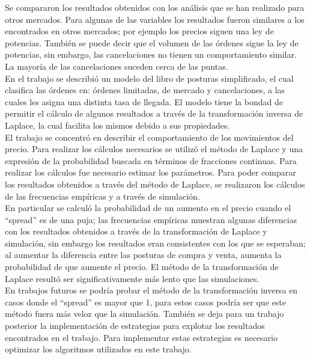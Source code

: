 \documentclass[11pt]{article}
\numberwithin{equation}{section} %
\begin{document}
Se compararon los resultados obtenidos con los análisis que se han realizado para otros mercados. Para algunas de las variables los resultados fueron similares a los encontrados en otros mercados; por ejemplo los precios siguen una ley de potencias. También se puede decir que el volumen de las órdenes sigue la ley de potencias, sin embargo, las cancelaciones no tienen un comportamiento similar. La mayoría de las cancelaciones suceden cerca de las puntas.\\

En el trabajo se describió un modelo del libro de posturas simplificado, el cual clasifica las órdenes en: órdenes limitadas, de mercado y cancelaciones, a las cuales les asigna una distinta tasa de llegada. El modelo tiene la bondad de permitir el cálculo de algunos resultados a través de la transformación inversa de Laplace, la cual facilita los mismos debido a sus propiedades.\\

El trabajo se concentró en describir el comportamiento de los movimientos del precio. Para realizar los cálculos necesarios se utilizó el método de Laplace y una expresión de la probabilidad buscada en términos de fracciones continuas. Para realizar los cálculos fue necesario estimar los parámetros. Para poder comparar los resultados obtenidos a través del método de Laplace, se realizaron los cálculos de las frecuencias empíricas y a través de simulación.\\

En particular se calculó la probabilidad de un aumento en el precio cuando el ``spread'' es de una puja; las frecuencias empíricas muestran algunas diferencias con los resultados obtenidos a través de la transformación de Laplace y simulación, sin embargo los resultados eran consistentes con los que se esperaban; al aumentar la diferencia entre las posturas de compra y venta, aumenta la probabilidad de que aumente el precio. El método de la transformación de Laplace resultó ser significativamente más lento que las simulaciones.\\

En trabajos futuros se podría probar el método de la transformación inversa en casos donde el ``spread'' es mayor que 1, para estos casos podría ser que este método fuera más veloz que la simulación. También se deja para un trabajo posterior la implementación de estrategias para explotar los resultados encontrados en el trabajo. Para implementar estas estrategias es necesario optimizar los algoritmos utilizados en este trabajo.\\
\end{document}
